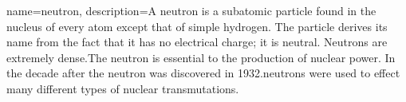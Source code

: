 {
    name=neutron,
    description={A neutron is a subatomic particle found in the nucleus of every atom except that of simple hydrogen.  The particle derives its name from the fact that it has no electrical charge; it is neutral.   Neutrons are extremely dense.The neutron is essential to the production of nuclear power. In the decade after the neutron was discovered in 1932.neutrons were used to effect many different types of nuclear transmutations.}
    }
   
